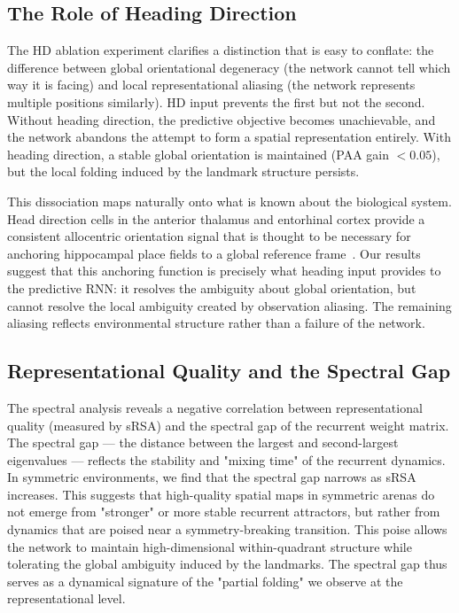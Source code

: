 \documentclass[11pt, a4paper]{article}
\begin{document}
\subsection{The Role of Heading Direction}

The HD ablation experiment clarifies a distinction that is easy to
conflate: the difference between global orientational degeneracy (the
network cannot tell which way it is facing) and local representational
aliasing (the network represents multiple positions similarly). HD input
prevents the first but not the second. Without heading direction, the
predictive objective becomes unachievable, and the network abandons the
attempt to form a spatial representation entirely. With heading direction,
a stable global orientation is maintained (PAA gain $< 0.05$), but the
local folding induced by the landmark structure persists.

This dissociation maps naturally onto what is known about the biological
system. Head direction cells in the anterior thalamus and entorhinal cortex
provide a consistent allocentric orientation signal that is thought to be
necessary for anchoring hippocampal place fields to a global reference
frame~\citep{lever2002}. Our results suggest that this anchoring function
is precisely what heading input provides to the predictive RNN: it resolves
the ambiguity about global orientation, but cannot resolve the local
ambiguity created by observation aliasing. The remaining
aliasing reflects environmental structure rather than a failure of the
network.

\subsection{Representational Quality and the Spectral Gap}

The spectral analysis reveals a negative correlation between representational quality (measured by sRSA) and the spectral gap of the recurrent weight matrix. The spectral gap --- the distance between the largest and second-largest eigenvalues --- reflects the stability and "mixing time" of the recurrent dynamics. In symmetric environments, we find that the spectral gap narrows as sRSA increases. This suggests that high-quality spatial maps in symmetric arenas do not emerge from "stronger" or more stable recurrent attractors, but rather from dynamics that are poised near a symmetry-breaking transition. This poise allows the network to maintain high-dimensional within-quadrant structure while tolerating the global ambiguity induced by the landmarks. The spectral gap thus serves as a dynamical signature of the "partial folding" we observe at the representational level.
\end{document}

